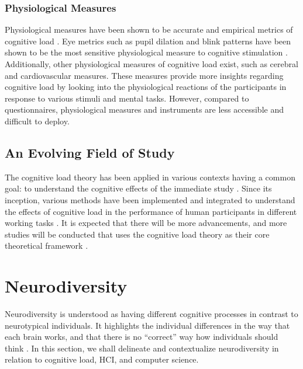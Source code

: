\subsubsection{Physiological Measures}
Physiological measures have been shown to be accurate and empirical metrics of cognitive load \cite{lecunff2024, castanheira2021, thees2020}. Eye metrics such as pupil dilation and blink patterns have been shown to be the most sensitive physiological measure to cognitive stimulation \cite{souchet2022, castro-alonso2020modality}. Additionally, other physiological measures of cognitive load exist, such as cerebral \cite{appel2019, babu2018} and cardiovascular \cite{ahmad2023, lecunff2024} measures. These measures provide more insights regarding cognitive load by looking into the physiological reactions of the participants in response to various stimuli and mental tasks. However, compared to questionnaires, physiological measures and instruments are less accessible and difficult to deploy.

\subsection{An Evolving Field of Study}
The cognitive load theory has been applied in various contexts having a common goal: to understand the cognitive effects of the immediate study \cite{sweller2019architecture}. Since its inception, various methods have been implemented and integrated to understand the effects of cognitive load in the performance of human participants in different working tasks \cite{sweller2019architecture}. It is expected that there will be more advancements, and more studies will be conducted that uses the cognitive load theory as their core theoretical framework \cite{sweller2019architecture}.

\section{Neurodiversity}
Neurodiversity is understood as having different cognitive processes in contrast to neurotypical individuals. It highlights the individual differences in the way that each brain works, and that there is no “correct” way how individuals should think \cite{mack2022, cognitive2025}. In this section, we shall delineate and contextualize neurodiversity in relation to cognitive load, HCI, and computer science.

